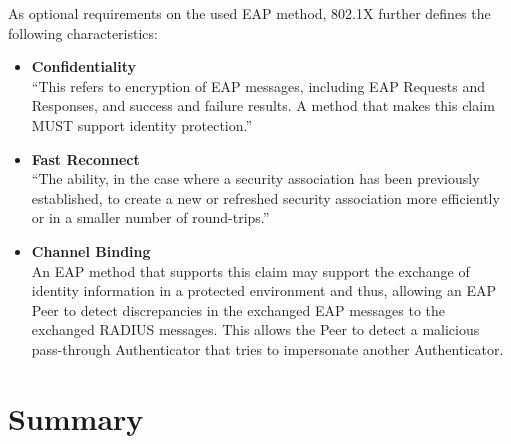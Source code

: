 As optional requirements on the used \ac{EAP} method, 802.1X further defines the following characteristics:

\begin{itemize}
    \setlength{\itemsep}{0pt}
    \item \textbf{Confidentiality}\\
    ``This refers to encryption of \ac{EAP} messages, including \ac{EAP} Requests
    and Responses, and success and failure results. A method that makes this claim MUST support identity protection.''\cite{rfc3748}
    \item \textbf{Fast Reconnect}\\
    ``The ability, in the case where a security association has been previously established, to create a new or refreshed security association more efficiently or in a smaller number of round-trips.''\cite{rfc3748}
    \item \textbf{Channel Binding}\\
    An \ac{EAP} method that supports this claim may support the exchange of identity information in a protected environment and thus, allowing an \ac{EAP} Peer to detect discrepancies in the exchanged \ac{EAP} messages to the exchanged RADIUS messages. This allows the Peer to detect a malicious pass-through Authenticator that tries to impersonate another Authenticator.
\end{itemize}



\section{Summary}

